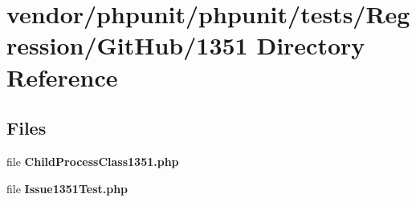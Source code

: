 \section{vendor/phpunit/phpunit/tests/\+Regression/\+Git\+Hub/1351 Directory Reference}
\label{dir_45d1c0452b04e42d4b90c65190e39eed}
\subsection*{Files}
\begin{DoxyCompactItemize}
\item 
file {\bf Child\+Process\+Class1351.\+php}
\item 
file {\bf Issue1351\+Test.\+php}
\end{DoxyCompactItemize}
